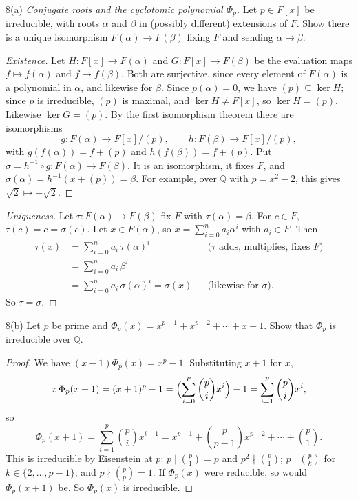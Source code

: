 \documentclass[11pt]{article}
\begin{document}
\begin{problem}{8(a)}
  \emph{Conjugate roots and the cyclotomic polynomial $\Phi_p$.} Let
  $p \in F[x]$ be irreducible, with roots $\alpha$ and $\beta$ in (possibly
  different) extensions of $F$. Show there is a unique isomorphism
  $F(\alpha) \to F(\beta)$ fixing $F$ and sending $\alpha \mapsto \beta$.
\end{problem}

\begin{proof}[Existence]
Let $H : F[x] \to F(\alpha)$ and $G : F[x] \to F(\beta)$ be the evaluation
maps $f \mapsto f(\alpha)$ and $f \mapsto f(\beta)$. Both are surjective,
since every element of $F(\alpha)$ is a polynomial in $\alpha$, and likewise
for $\beta$. Since $p(\alpha) = 0$, we have $(p) \subseteq \ker H$; since $p$ is
irreducible, $(p)$ is maximal, and $\ker H \neq F[x]$, so $\ker H = (p)$.
Likewise $\ker G = (p)$. By the first isomorphism theorem there are
isomorphisms
\[
  g : F(\alpha) \to F[x]/(p), \qquad h : F(\beta) \to F[x]/(p),
\]
with $g(f(\alpha)) = f + (p)$ and $h(f(\beta)) = f + (p)$. Put
$\sigma = h^{-1} \circ g : F(\alpha) \to F(\beta)$. It is an isomorphism, it
fixes $F$, and $\sigma(\alpha) = h^{-1}(x + (p)) = \beta$.
For example, over $\mathbb{Q}$ with $p = x^2 - 2$, this gives
$\sqrt{2} \mapsto -\sqrt{2}$.
\end{proof}
\begin{proof}[Uniqueness]
Let $\tau : F(\alpha) \to F(\beta)$ fix $F$ with $\tau(\alpha) = \beta$. For
$c \in F$, $\tau(c) = c = \sigma(c)$. Let $x \in F(\alpha)$, so
$x = \sum_{i=0}^{n} a_i \alpha^i$ with $a_i \in F$. Then
\begin{align*}
  \tau(x) &= \sum_{i=0}^{n} a_i\, \tau(\alpha)^i && \text{($\tau$ adds, multiplies, fixes $F$)} \\
          &= \sum_{i=0}^{n} a_i\, \beta^i \\
          &= \sum_{i=0}^{n} a_i\, \sigma(\alpha)^i = \sigma(x) && \text{(likewise for $\sigma$)}.
\end{align*}
So $\tau = \sigma$.
\end{proof}

\begin{problem}{8(b)}
  Let $p$ be prime and
  $\Phi_p(x) = x^{p-1} + x^{p-2} + \cdots + x + 1$. Show that $\Phi_p$ is
  irreducible over $\mathbb{Q}$.
\end{problem}

\begin{proof}
We have $(x-1)\Phi_p(x) = x^p - 1$. Substituting $x+1$ for $x$,
\[
  x\,\Phi_p(x+1) = (x+1)^p - 1
    = \Bigl(\sum_{i=0}^{p} \binom{p}{i} x^i\Bigr) - 1
    = \sum_{i=1}^{p} \binom{p}{i} x^i ,
\]
so
\[
  \Phi_p(x+1) = \sum_{i=1}^{p} \binom{p}{i} x^{i-1}
    = x^{p-1} + \binom{p}{p-1} x^{p-2} + \cdots + \binom{p}{1}.
\]
This is irreducible by Eisenstein at $p$: $p \mid \binom{p}{1} = p$ and
$p^2 \nmid \binom{p}{1}$; $p \mid \binom{p}{k}$ for $k \in \{2, \dots, p-1\}$;
and $p \nmid \binom{p}{p} = 1$. If $\Phi_p(x)$ were reducible, so would
$\Phi_p(x+1)$ be. So $\Phi_p(x)$ is irreducible.
\end{proof}
\end{document}
